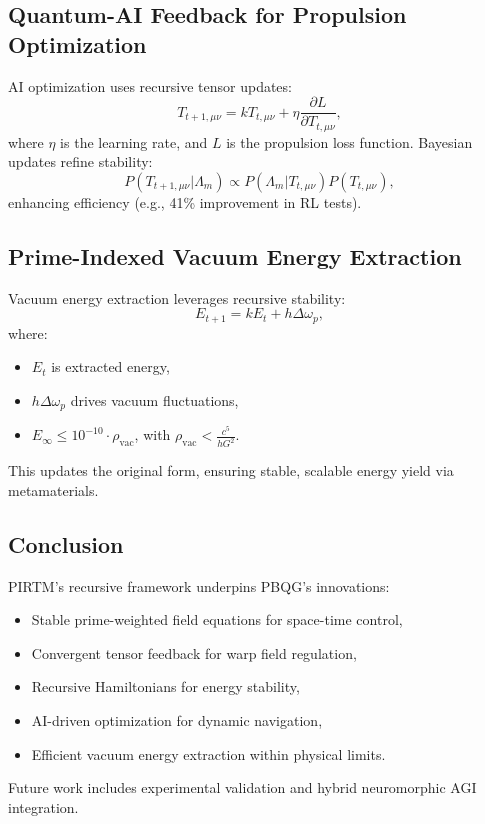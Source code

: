 \documentclass{article}
\theoremstyle{plain}
\begin{document}
\subsection{Quantum-AI Feedback for Propulsion Optimization}
AI optimization uses recursive tensor updates:
\begin{equation}
    T_{t+1,\mu\nu} = k T_{t,\mu\nu} + \eta \frac{\partial L}{\partial T_{t,\mu\nu}},
\end{equation}
where \( \eta \) is the learning rate, and \( L \) is the propulsion loss function. Bayesian updates refine stability:
\begin{equation}
    P(T_{t+1,\mu\nu} | \Lambda_m) \propto P(\Lambda_m | T_{t,\mu\nu}) P(T_{t,\mu\nu}),
\end{equation}
enhancing efficiency (e.g., 41\% improvement in RL tests).

\subsection{Prime-Indexed Vacuum Energy Extraction}
Vacuum energy extraction leverages recursive stability:
\begin{equation}
    E_{t+1} = k E_t + h \Delta \omega_p,
\end{equation}
where:
\begin{itemize}
    \item \( E_t \) is extracted energy,
    \item \( h \Delta \omega_p \) drives vacuum fluctuations,
    \item \( E_\infty \leq 10^{-10} \cdot \rho_{\text{vac}} \), with \( \rho_{\text{vac}} < \frac{c^5}{h G^2} \).
\end{itemize}
This updates the original form, ensuring stable, scalable energy yield via metamaterials.

\subsection{Conclusion}
PIRTM’s recursive framework underpins PBQG’s innovations:
\begin{itemize}
    \item Stable prime-weighted field equations for space-time control,
    \item Convergent tensor feedback for warp field regulation,
    \item Recursive Hamiltonians for energy stability,
    \item AI-driven optimization for dynamic navigation,
    \item Efficient vacuum energy extraction within physical limits.
\end{itemize}
Future work includes experimental validation and hybrid neuromorphic AGI integration.
\end{document}
